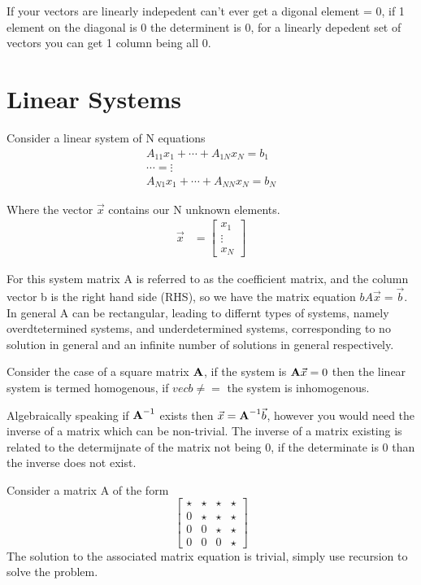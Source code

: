 \documentclass{article}
\newcommand{\be}{\begin{equation}}
\newcommand{\ee}{\end{equation}}
\newcommand{\bA}{\mbox{\bf A}}
\begin{document}
If your vectors are linearly indepedent can't ever get a digonal element = 0, if 1 element on the diagonal is 0 the determinent is 0, for a linearly depedent set of vectors you can get 1 column being all 0. 

\section{Linear Systems}
Consider a linear system of N equations
\begin{align}
    A_{11} x_1 + \cdots + A_{1N}x_N = b_1\\ 
    \cdots = \vdots\\
    A_{N1} x_1 + \cdots + A_{NN}x_N = b_N
\end{align}

Where the vector $\vec{x}$ contains our N unknown elements. 
\begin{align}
    \vec{x} &= \begin{bmatrix}
           x_{1} \\
           \vdots \\
           x_{N}
         \end{bmatrix}
\end{align}

For this system matrix A is referred to as the coefficient matrix, and the column vector b is the right hand side (RHS), so we have the matrix equation $bA\vec{x} = \vec{b}$.
In general A can be rectangular, leading to differnt types of systems, namely overdtetermined systems, and underdetermined systems, corresponding to no solution in general and an infinite number of solutions in general respectively. 

Consider the case of a square matrix $\bA$, if the system is $\bA\vec{x} = 0$ then the linear system is termed homogenous, if $vec{b} \neq =$ the system is inhomogenous. 

Algebraically speaking if $\bA^{-1}$ exists then $\vec{x} = \bA^{-1}\vec{b}$, however you would need the inverse of a matrix which can be non-trivial.
The inverse of a matrix existing is related to the determijnate of the matrix not being 0, if the determinate is 0 than the inverse does not exist. 

Consider a matrix A of the form
\be
\begin{bmatrix}
    \star  & \star & \star & \star \\
     0 & \star &\star &  \star \\
     0 & 0 &  \star &  \star \\
    0  & 0 & 0 &  \star 
\end{bmatrix}
\ee
The solution to the associated matrix equation is trivial, simply use recursion to solve the problem.
\end{document}

